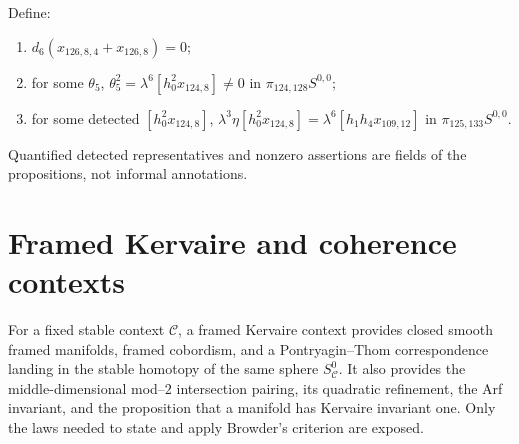 \begin{definition}
  \label{def:near126-conditions}
  \notready
  Define:
  \begin{enumerate}
    \item[$C_3$:] $d_6(x_{126,8,4}+x_{126,8})=0$;
    \item[$C_4$:] for some $\theta_5$,
      $\theta_5^2=\lambda^6[h_0^2x_{124,8}]\ne0$ in
      $\pi_{124,128}S^{0,0}$;
    \item[$C_5$:] for some detected $[h_0^2x_{124,8}]$,
      $\lambda^3\eta[h_0^2x_{124,8}]
       =\lambda^6[h_1h_4x_{109,12}]$ in
      $\pi_{125,133}S^{0,0}$.
  \end{enumerate}
  Quantified detected representatives and nonzero assertions are fields of the
  propositions, not informal annotations.
\end{definition}

\section{Framed Kervaire and coherence contexts}

\begin{definition}
  \label{def:framed-kervaire-context}
  \notready
  For a fixed stable context $\mathcal C$, a framed Kervaire context provides
  closed smooth framed manifolds, framed cobordism, and a Pontryagin--Thom
  correspondence landing in the stable homotopy of the same sphere
  $S^0_{\mathcal C}$.  It also provides the middle-dimensional mod--$2$
  intersection pairing, its quadratic refinement, the Arf invariant, and the
  proposition that a manifold has Kervaire invariant one.  Only the laws needed
  to state and apply Browder's criterion are exposed.
\end{definition}

